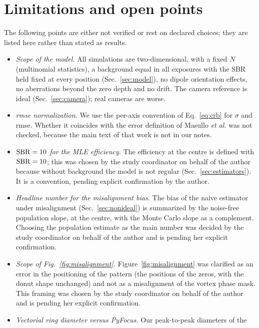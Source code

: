 \section{Limitations and open points}\label{sec:open}

The following points are either not verified or rest on declared choices; they are listed here
rather than stated as results.

\begin{itemize}
\item \emph{Scope of the model.} All simulations are two-dimensional, with a fixed $N$
(multinomial statistics), a background equal in all exposures with the SBR held fixed at every
position (Sec.~\ref{sec:model}), no dipole orientation effects,
no aberrations beyond the zero depth and no drift. The camera reference is ideal
(Sec.~\ref{sec:camera}); real cameras are worse.
\item \emph{rmse normalization.} We use the per-axis convention of Eq.~\eqref{eq:crb} for $\sigma$
and rmse. Whether it coincides with the error definition of Masullo \textit{et al.}
\cite{Masullo2022} was not checked, because the main text of that work is not in our notes.
\item \emph{$\mathrm{SBR}=10$ for the MLE efficiency.} The efficiency at the centre is defined with
$\mathrm{SBR}=10$; this was chosen by the study coordinator on behalf of the author because without
background the model is not regular (Sec.~\ref{sec:estimators}). It is a convention, pending
explicit confirmation by the author.
\item \emph{Headline number for the misalignment bias.} The bias of the naive estimator under
misalignment (Sec.~\ref{sec:nonideal}) is summarized by the noise-free population slope,
at the centre, with the Monte Carlo slope as a complement. Choosing the population estimate as
the main number was decided by the study coordinator on behalf of the author and is pending
her explicit confirmation.
\item \emph{Scope of Fig.~\ref{fig:misalignment}.} Figure~\ref{fig:misalignment} was clarified
as an error in the positioning of the pattern (the positions of the zeros, with the donut shape
unchanged) and not as a misalignment of the vortex phase mask. This framing was chosen by the
study coordinator on behalf of the author and is pending her explicit confirmation.
\item \emph{Vectorial ring diameter versus PyFocus.} Our peak-to-peak diameters of the

\end{itemize}
